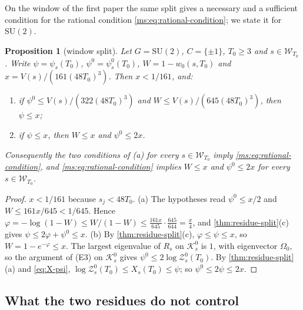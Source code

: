 \documentclass[11pt,a4paper]{amsart}
\newtheorem{proposition}[theorem]{Proposition}
\theoremstyle{definition}
\theoremstyle{remark}
\numberwithin{equation}{section}
\newcommand{\Kspace}{\mathcal{K}}    %
\newcommand{\Wwin}{\mathcal{W}}      %
\newcommand{\SU}{\mathrm{SU}}              %
\newcommand{\TT}{\mathbb{T}}               %
\newcommand{\Zc}{\mathcal{Z}}              %
\newcommand{\XT}[2]{X_{#1}(#2)}            %
\newcommand{\psiT}[2]{\psi_{#1}(#2)}       %
\newcommand{\Vol}[1]{V(#1)}                %
\newcommand{\Omegazero}{\Omega_0}          %
\begin{document}
On the window of the first paper the same split gives a necessary and a sufficient condition for the rational condition \eqref{ms:eq:rational-condition}; we state it for $\SU(2)$.

\begin{proposition}[window split]\label{prop:window-split}
Let $G=\SU(2)$, $C=\{\pm1\}$, $T_0\ge3$ and $s\in\Wwin_{T_0}$. Write $\psi=\psiT{s}{T_0}$, $\psi^0=\psi^0_s(T_0)$, $W=1-w_0(s,T_0)$ and $x=\Vol{s}/(161(48T_0)^3)$. Then $x<1/161$, and:
\begin{enumerate}[label=\textup{(\alph*)},leftmargin=*]
\item if $\psi^0\le\Vol{s}/(322(48T_0)^3)$ and $W\le\Vol{s}/(645(48T_0)^3)$, then $\psi\le x$;
\item if $\psi\le x$, then $W\le x$ and $\psi^0\le2x$.
\end{enumerate}
Consequently the two conditions of \textup{(a)} for every $s\in\Wwin_{T_0}$ imply \eqref{ms:eq:rational-condition}, and \eqref{ms:eq:rational-condition} implies $W\le x$ and $\psi^0\le2x$ for every $s\in\Wwin_{T_0}$.
\end{proposition}

\begin{proof}
$x<1/161$ because $s_j<48T_0$. (a) The hypotheses read $\psi^0\le x/2$ and $W\le161x/645<1/645$. Hence $\varphi=-\log(1-W)\le W/(1-W)\le\frac{161x}{645}\cdot\frac{645}{644}=\frac x4$, and \cref{thm:residue-split}\textup{(c)} gives $\psi\le2\varphi+\psi^0\le x$. (b) By \cref{thm:residue-split}\textup{(c)}, $\varphi\le\psi\le x$, so $W=1-e^{-\varphi}\le x$. The largest eigenvalue of $R_s$ on $\Kspace^0_s$ is $1$, with eigenvector $\Omegazero$, so the argument of (E3) on $\Kspace^0_s$ gives $\psi^0\le2\log\Zc^0_s(T_0)$. By \cref{thm:residue-split}\textup{(a)} and \eqref{eq:X-psi}, $\log\Zc^0_s(T_0)\le\XT{s}{T_0}\le\psi$; so $\psi^0\le2\psi\le2x$.
\end{proof}

\subsection{What the two residues do not control}
\end{document}

